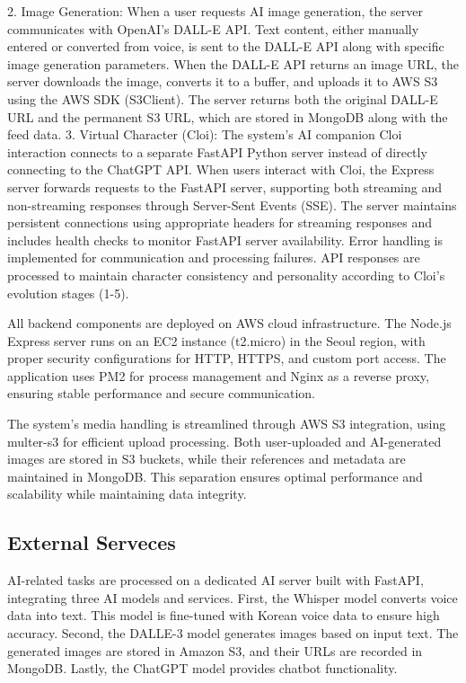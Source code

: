             2. Image Generation: When a user requests AI image generation, the server communicates with OpenAI's DALL-E API. Text content, either manually entered or converted from voice, is sent to the DALL-E API along with specific image generation parameters. When the DALL-E API returns an image URL, the server downloads the image, converts it to a buffer, and uploads it to AWS S3 using the AWS SDK (S3Client). The server returns both the original DALL-E URL and the permanent S3 URL, which are stored in MongoDB along with the feed data.
            3. Virtual Character (Cloi): The system's AI companion Cloi interaction connects to a separate FastAPI Python server instead of directly connecting to the ChatGPT API. When users interact with Cloi, the Express server forwards requests to the FastAPI server, supporting both streaming and non-streaming responses through Server-Sent Events (SSE). The server maintains persistent connections using appropriate headers for streaming responses and includes health checks to monitor FastAPI server availability. Error handling is implemented for communication and processing failures. API responses are processed to maintain character consistency and personality according to Cloi's evolution stages (1-5).
            
            All backend components are deployed on AWS cloud infrastructure. The Node.js Express server runs on an EC2 instance (t2.micro) in the Seoul region, with proper security configurations for HTTP, HTTPS, and custom port access. The application uses PM2 for process management and Nginx as a reverse proxy, ensuring stable performance and secure communication.
            
            The system's media handling is streamlined through AWS S3 integration, using multer-s3 for efficient upload processing. Both user-uploaded and AI-generated images are stored in S3 buckets, while their references and metadata are maintained in MongoDB. This separation ensures optimal performance and scalability while maintaining data integrity.
            \vspace{3mm}
    \subsection{External Serveces}
        AI-related tasks are processed on a dedicated AI server built with FastAPI, integrating three AI models and services. First, the Whisper model converts voice data into text. This model is fine-tuned with Korean voice data to ensure high accuracy. Second, the DALLE-3 model generates images based on input text. The generated images are stored in Amazon S3, and their URLs are recorded in MongoDB. Lastly, the ChatGPT model provides chatbot functionality.

